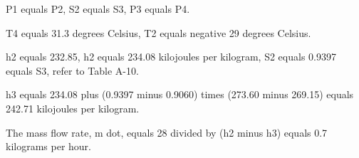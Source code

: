 P1 equals P2, S2 equals S3, P3 equals P4.

T4 equals 31.3 degrees Celsius, T2 equals negative 29 degrees Celsius.

h2 equals 232.85, h2 equals 234.08 kilojoules per kilogram, S2 equals 0.9397 equals S3, refer to Table A-10.

h3 equals 234.08 plus (0.9397 minus 0.9060) times (273.60 minus 269.15) equals 242.71 kilojoules per kilogram.

The mass flow rate, m dot, equals 28 divided by (h2 minus h3) equals 0.7 kilograms per hour.